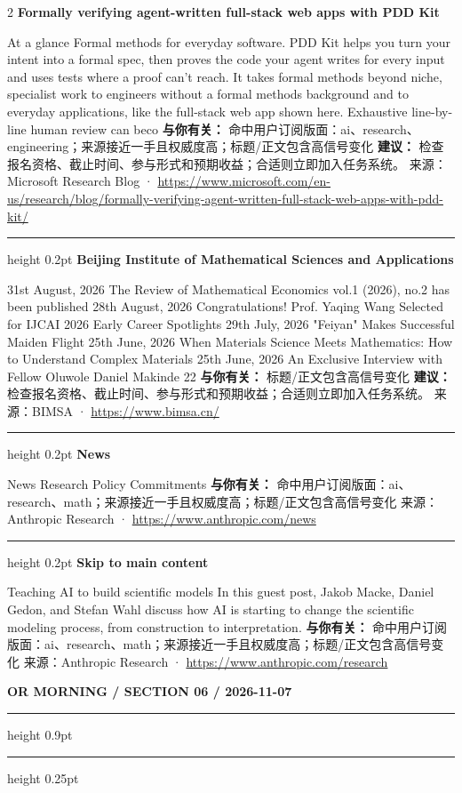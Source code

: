 \documentclass[10.5pt]{ctexart}
\begin{document}
\begin{multicols}{2}
{\large\bfseries Formally verifying agent-written full-stack web apps with PDD Kit}\par
At a glance Formal methods for everyday software. PDD Kit helps you turn your intent into a formal spec, then proves the code your agent writes for every input and uses tests where a proof can’t reach. It takes formal methods beyond niche, specialist work to engineers without a formal methods background and to everyday applications, like the full-stack web app shown here. Exhaustive line-by-line human review can beco
\textbf{与你有关：} 命中用户订阅版面：ai、research、engineering；来源接近一手且权威度高；标题/正文包含高信号变化
\textbf{建议：} 检查报名资格、截止时间、参与形式和预期收益；合适则立即加入任务系统。
{\footnotesize\color{ormuted} 来源：Microsoft Research Blog · \url{https://www.microsoft.com/en-us/research/blog/formally-verifying-agent-written-full-stack-web-apps-with-pdd-kit/}}
\vspace{2mm}
\hrule height 0.2pt
\vspace{2mm}
{\large\bfseries Beijing Institute of Mathematical Sciences and Applications}\par
31st August, 2026 The Review of Mathematical Economics vol.1 (2026), no.2 has been published 28th August, 2026 Congratulations! Prof. Yaqing Wang Selected for IJCAI 2026 Early Career Spotlights 29th July, 2026 "Feiyan" Makes Successful Maiden Flight 25th June, 2026 When Materials Science Meets Mathematics: How to Understand Complex Materials 25th June, 2026 An Exclusive Interview with Fellow Oluwole Daniel Makinde 22
\textbf{与你有关：} 标题/正文包含高信号变化
\textbf{建议：} 检查报名资格、截止时间、参与形式和预期收益；合适则立即加入任务系统。
{\footnotesize\color{ormuted} 来源：BIMSA · \url{https://www.bimsa.cn/}}
\vspace{2mm}
\hrule height 0.2pt
\vspace{2mm}
{\large\bfseries News}\par
News Research Policy Commitments
\textbf{与你有关：} 命中用户订阅版面：ai、research、math；来源接近一手且权威度高；标题/正文包含高信号变化
{\footnotesize\color{ormuted} 来源：Anthropic Research · \url{https://www.anthropic.com/news}}
\vspace{2mm}
\hrule height 0.2pt
\vspace{2mm}
{\large\bfseries Skip to main content}\par
Teaching AI to build scientific models In this guest post, Jakob Macke, Daniel Gedon, and Stefan Wahl discuss how AI is starting to change the scientific modeling process, from construction to interpretation.
\textbf{与你有关：} 命中用户订阅版面：ai、research、math；来源接近一手且权威度高；标题/正文包含高信号变化
{\footnotesize\color{ormuted} 来源：Anthropic Research · \url{https://www.anthropic.com/research}}
\end{multicols}
\newpage
{\small\bfseries OR MORNING / SECTION 06 / 2026-11-07}
\vspace{2mm}
\hrule height 0.9pt
\vspace{1.5mm}
\hrule height 0.25pt
\vspace{4mm}
\end{document}
